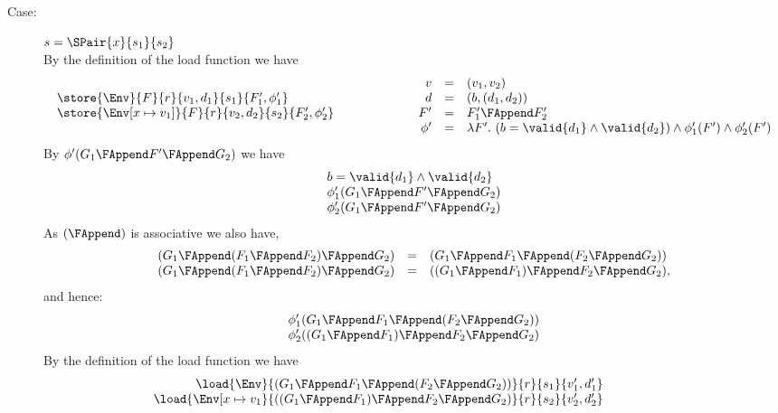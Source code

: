 {\begin{description}
\item[Case:] $s = \SPair{x}{s_1}{s_2}$\\[1ex]
%
By the definition of the load function we have
\[
\begin{array}{l}
\store{\Env}{F}{r}{v_1,d_1}{s_1}{F_1',\phi_1'}\\
\store{\Env[x \mapsto v_1]}{F}{r}{v_2,d_2}{s_2}{F_2',\phi_2'}\\
\end{array}\hspace*{2cm}\begin{array}{rcl}
v &=& (v_1,v_2)\\
d &=& (b,(d_1,d_2))\\
F' &=& F_1' \FAppend F_2'\\
\phi' &=& \lambda F'.~(b = \valid{d_1} \wedge \valid{d_2}) \wedge \phi_1'(F') \wedge \phi_2'(F')\\
\end{array}
\]
By $\phi'(G_1 \FAppend F' \FAppend G_2)$ we have
\[
\begin{array}{l}
b = \valid{d_1} \wedge \valid{d_2}\\
\phi_1'(G_1 \FAppend F' \FAppend G_2)\\
\phi_2'(G_1 \FAppend F' \FAppend G_2)\\
\end{array}
\]
%
As $(\FAppend)$ is associative we also have,
\[
\begin{array}{rcl}
(G_1\FAppend (F_1\FAppend F_2)\FAppend G_2) &=& (G_1\FAppend F_1\FAppend (F_2\FAppend G_2))\\
(G_1\FAppend (F_1\FAppend F_2)\FAppend G_2) &=& ((G_1\FAppend F_1)\FAppend F_2\FAppend G_2),\\
\end{array}
\]
and hence:
\[
\begin{array}{l}
\phi_1'(G_1\FAppend F_1\FAppend (F_2\FAppend G_2))\\
\phi_2'((G_1\FAppend F_1)\FAppend F_2\FAppend G_2)\\
\end{array}
\]
By the definition of the load function we have 
\[ 
\begin{array}{rcll}
\load{\Env}{(G_1 \FAppend F_1 \FAppend (F_2 \FAppend G_2))}{r}{s_1}{v_1',d_1'}\\
\load{\Env[x \mapsto v_1}{((G_1 \FAppend F_1) \FAppend F_2 \FAppend G_2)}{r}{s_2}{v_2',d_2'}\\
\end{array}\hspace*{2cm}\begin{array}{rcl}

\end{array}\]
\end{description}}
